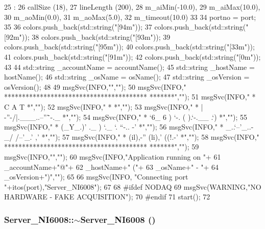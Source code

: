 \begin{DoxyCode}
25                                     :
26   callSize   (18),
27   lineLength (200),
28   m_aiMin(-10.0),
29   m_aiMax(10.0),
30   m_aoMin(0.0),
31   m_aoMax(5.0),
32   m_timeout(10.0)
33 {
34   portno = port;
35   
36   colors.push_back(std::string("[94m"));
37   colors.push_back(std::string("[92m"));
38   colors.push_back(std::string("[93m"));
39   colors.push_back(std::string("[95m"));
40   colors.push_back(std::string("[33m"));
41   colors.push_back(std::string("[91m"));
42   colors.push_back(std::string("[0m"));
43 
44   std::string _accountName = accountName();
45   std::string _hostName    = hostName();
46   std::string _osName      = osName();
47   std::string _osVersion   = osVersion();
48 
49   msgSvc(INFO,"","");
50   msgSvc(INFO,"                          ****************************************
      *******","");
51   msgSvc(INFO,"                          *               C      A      T         
            *","");
52   msgSvc(INFO,"                          *                                       
            *","");
53   msgSvc(INFO,"                          *          |\\-''-/|.___..--''\"`-._    
              *","");
54   msgSvc(INFO,"                          *          `6_ 6  )   `-.  (     ).`-.__
      .`)   *","");
55   msgSvc(INFO,"                          *          (_Y_.)'  ._   )  `._ `. ``-..
      -'    *","");
56   msgSvc(INFO,"                          *         _..`--'_..-  _/ /--'_.' ,'    
            *","");
57   msgSvc(INFO,"                          *     (il),-''  (li),' ((!.-'           
            *","");
58   msgSvc(INFO,"                          ****************************************
      *******","");
59   msgSvc(INFO,"","");
60   msgSvc(INFO,"Application running on "+
61          _accountName+"@"+
62          _hostName+" ("+
63          _osName+" - "+
64          _osVersion+")","");
65   
66   msgSvc(INFO, "Connecting port "+itos(port),"Server_NI6008");
67 
68 #ifdef NODAQ
69   msgSvc(WARNING,"NO HARDWARE - FAKE ACQUISITION");
70 #endif  
71   start();
72 }

\end{DoxyCode}
\hypertarget{classServer__NI6008_a1c9bf761d7bae3ee267363fb851171b7}{
\subsubsection[{$\sim$Server\_\-NI6008}]{\setlength{\rightskip}{0pt plus 5cm}Server\_\-NI6008::$\sim$Server\_\-NI6008 ()}}
\label{classServer__NI6008_a1c9bf761d7bae3ee267363fb851171b7}


